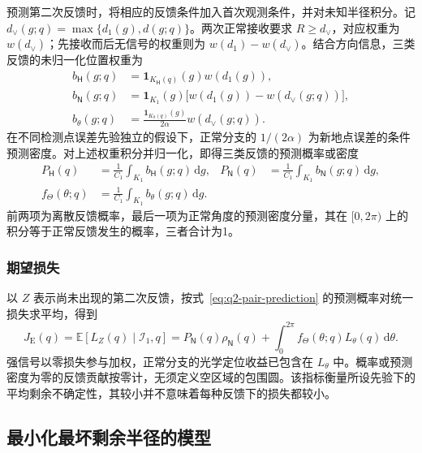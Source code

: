 \documentclass[UTF8,a4paper,zihao=-4,fontset=none]{ctexart}
\begin{document}
预测第二次反馈时，将相应的反馈条件加入首次观测条件，并对未知半径积分。记 \(d_\vee(g;q)=\max\{d_1(g),d(g;q)\}\)。两次正常接收要求 \(R\ge d_\vee\)，对应权重为 \(w(d_\vee)\)；先接收而后无信号的权重则为 \(w(d_1)-w(d_\vee)\)。结合方向信息，三类反馈的未归一化位置权重为
\begin{equation}
\begin{aligned}
 b_{\mathsf H}(g;q)&=\mathbf1_{K_{\mathsf H}(q)}(g)w(d_1(g)),\\
 b_{\mathsf N}(g;q)&=\mathbf1_{K_1}(g)\bigl[w(d_1(g))-w(d_\vee(g;q))\bigr],\\
 b_\theta(g;q)&=\frac{\mathbf1_{K_\theta(q)}(g)}{2\alpha}w(d_\vee(g;q)).
\end{aligned}
\label{eq:q2-pair-feedback-weights}
\end{equation}
在不同检测点误差先验独立的假设下，正常分支的 \(1/(2\alpha)\) 为新地点误差的条件预测密度。对上述权重积分并归一化，即得三类反馈的预测概率或密度
\begin{equation}
\begin{aligned}
 P_{\mathsf H}(q)&=\frac{1}{C_1}\int_{K_1}b_{\mathsf H}(g;q)\,\mathrm dg,
 &P_{\mathsf N}(q)&=\frac{1}{C_1}\int_{K_1}b_{\mathsf N}(g;q)\,\mathrm dg,\\
 f_\Theta(\theta;q)&=\frac{1}{C_1}\int_{K_1}b_\theta(g;q)\,\mathrm dg.
\end{aligned}
\label{eq:q2-pair-prediction}
\end{equation}
前两项为离散反馈概率，最后一项为正常角度的预测密度分量，其在 \([0,2\pi)\) 上的积分等于正常反馈发生的概率，三者合计为1。

\subsubsection{期望损失}

以 \(Z\) 表示尚未出现的第二次反馈，按式~\eqref{eq:q2-pair-prediction} 的预测概率对统一损失求平均，得到
\begin{equation}
 J_{\mathrm E}(q)=\mathbb E[L_Z(q)\mid\mathcal I_1,q]
 =P_{\mathsf N}(q)\rho_{\mathsf N}(q)
 +\int_0^{2\pi}f_\Theta(\theta;q)L_\theta(q)\,\mathrm d\theta.
\label{eq:q2-pair-expected-objective}
\end{equation}
强信号以零损失参与加权，正常分支的光学定位收益已包含在 \(L_\theta\) 中。概率或预测密度为零的反馈贡献按零计，无须定义空区域的包围圆。该指标衡量所设先验下的平均剩余不确定性，其较小并不意味着每种反馈下的损失都较小。

\subsection{最小化最坏剩余半径的模型}
\end{document}
